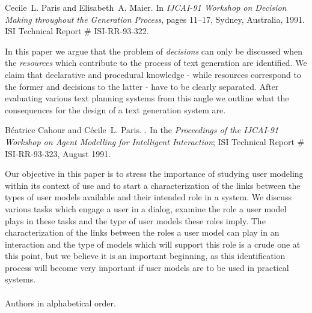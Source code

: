 \begin{thebibliography}{10}
Cecile~L. Paris and Elisabeth~A. Maier.
\newblock In {\em IJCAI-91 Workshop on Decision Making throughout the
  Generation Process}, pages 11--17, Sydney, Australia, 1991.
\newblock ISI Technical Report \# ISI-RR-93-322.

{\leftskip=0.1in\rightskip=0.1in\begin{small}\par{}In
  this paper we argue that the problem of {\em decisions\/} can only be
  discussed when the {\em resources\/} which contribute to the process of text
  generation are identified. We claim that declarative and procedural knowledge
  - while resources correspond to the former and decisions to the latter - have
  to be clearly separated. After evaluating various text planning systems from
  this angle we outline what the consequences for the design of a text
  generation system are.\end{small}\par}
\noindent\hspace*{\itemindent}{\leftskip=0.1in\rightskip=0.1in\hrulefill}

B\'eatrice Cahour and C\'{e}cile~L. Paris.
.
\newblock In the {\em Proceedings of the IJCAI-91 Workshop on Agent Modelling
  for Intelligent Interaction\/}; ISI Technical Report \# ISI-RR-93-323, August
  1991.

{\leftskip=0.1in\rightskip=0.1in\begin{small}\par{}Our
  objective in this paper is to stress the importance of studying user modeling
  within its context of use and to start a characterization of the links
  between the types of user models available and their intended role in a
  system. We discuss various tasks which engage a user in a dialog, examine the
  role a user model plays in these tasks and the type of user models these
  roles imply. The characterization of the links between the roles a user model
  can play in an interaction and the type of models which will support this
  role is a crude one at this point, but we believe it is an important
  beginning, as this identification process will become very important if user
  models are to be used in practical systems.\\ \\ Authors in alphabetical
  order.\end{small}\par}
\noindent\hspace*{\itemindent}{\leftskip=0.1in\rightskip=0.1in\hrulefill}


\end{thebibliography}
